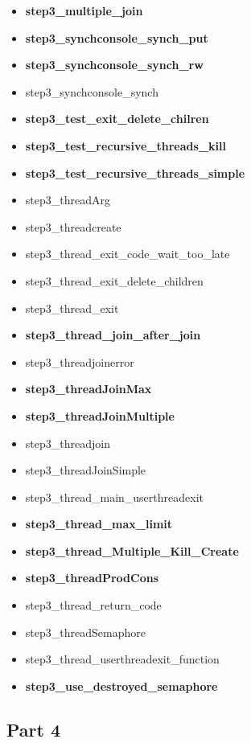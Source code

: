 \documentclass[a4paper,10pt]{article}
\begin{document}
\begin{itemize}
\item {\bf step3_multiple_join}
\item {\bf step3_synchconsole_synch_put}
\item {\bf step3_synchconsole_synch_rw}
\item step3_synchconsole_synch
\item {\bf step3_test_exit_delete_chilren}
\item {\bf step3_test_recursive_threads_kill}
\item {\bf step3_test_recursive_threads_simple}
\item step3_threadArg
\item step3_threadcreate
\item step3_thread_exit_code_wait_too_late
\item step3_thread_exit_delete_children
\item step3_thread_exit
\item {\bf step3_thread_join_after_join}
\item step3_threadjoinerror
\item {\bf step3_threadJoinMax}
\item {\bf step3_threadJoinMultiple}
\item step3_threadjoin
\item step3_threadJoinSimple
\item step3_thread_main_userthreadexit
\item {\bf step3_thread_max_limit}
\item {\bf step3_thread_Multiple_Kill_Create}
\item {\bf step3_threadProdCons}
\item step3_thread_return_code
\item step3_threadSemaphore
\item step3_thread_userthreadexit_function
\item {\bf step3_use_destroyed_semaphore}
\end{itemize} 

\subsection{Part 4}
\end{document}
